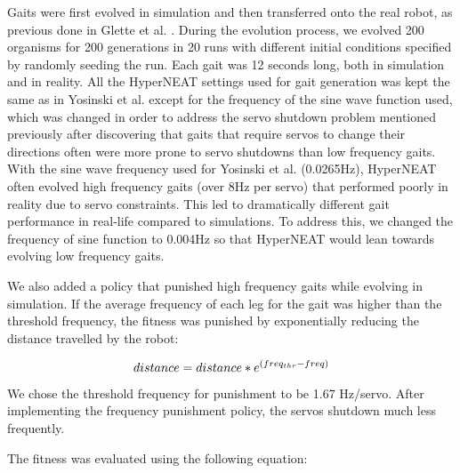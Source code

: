 Gaits were first evolved in simulation and then transferred onto the real robot, as previous done in Glette et al. \cite{glette}. 
During the evolution process, we evolved 200 organisms for 200 generations in 20 runs with different initial conditions specified by randomly seeding the run. 
Each gait was 12 seconds long, both in simulation and in reality. 
All the HyperNEAT settings used for gait generation was kept the same as in Yosinski et al. \cite{yos:clune} except for the frequency of the sine wave function used, which was changed in order to address the servo shutdown problem mentioned previously after discovering that gaits that require servos to change their directions often were more prone to servo shutdowns than low frequency gaits. %
With the sine wave frequency used for Yosinski et al. \cite{yos:clune} (0.0265Hz), HyperNEAT often evolved high frequency gaits (over 8Hz per servo) that performed poorly in reality due to servo constraints. 
This led to dramatically different gait performance in real-life compared to simulations. 
To address this, we changed the frequency of sine function to 0.004Hz so that HyperNEAT would lean towards evolving low frequency gaits.


%
%

We also added a policy that punished high frequency gaits while evolving in simulation. 
If the average frequency of each leg for the gait was higher than the threshold frequency, the fitness was punished by exponentially reducing the distance travelled by the robot:

\begin{equation}
distance = distance*e^{(freq_{thr}-freq)} \\
\end{equation}

We chose the threshold frequency for punishment to be 1.67 Hz/servo. After implementing the frequency punishment policy, the servos shutdown much less frequently. 


The fitness was evaluated using the following equation:

